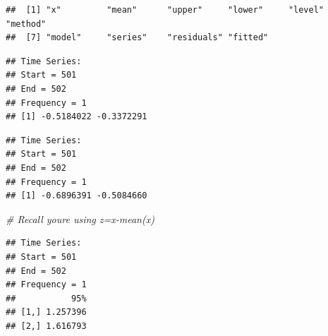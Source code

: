 \documentclass[
]{book}
\newenvironment{Shaded}{\begin{snugshade}}{\end{snugshade}}
\newcommand{\CommentTok}[1]{\textcolor[rgb]{0.56,0.35,0.01}{\textit{#1}}}
\newcommand{\FunctionTok}[1]{\textcolor[rgb]{0.00,0.00,0.00}{#1}}
\newcommand{\NormalTok}[1]{#1}
\newcommand{\SpecialCharTok}[1]{\textcolor[rgb]{0.00,0.00,0.00}{#1}}
\theoremstyle{definition}
\theoremstyle{definition}
\theoremstyle{definition}
\theoremstyle{definition}
\theoremstyle{remark}
\begin{document}
\begin{verbatim}
##  [1] "x"         "mean"      "upper"     "lower"     "level"     "method"   
##  [7] "model"     "series"    "residuals" "fitted"
\end{verbatim}

\begin{Shaded}
\end{Shaded}

\begin{verbatim}
## Time Series:
## Start = 501 
## End = 502 
## Frequency = 1 
## [1] -0.5184022 -0.3372291
\end{verbatim}

\begin{Shaded}
\end{Shaded}

\begin{verbatim}
## Time Series:
## Start = 501 
## End = 502 
## Frequency = 1 
## [1] -0.6896391 -0.5084660
\end{verbatim}

\begin{Shaded}
\begin{Highlighting}[]
\CommentTok{\# Recall you\textquotesingle{}re using z=x{-}mean(x)}
\end{Highlighting}
\end{Shaded}

\begin{Shaded}
\end{Shaded}

\begin{verbatim}
## Time Series:
## Start = 501 
## End = 502 
## Frequency = 1 
##           95%
## [1,] 1.257396
## [2,] 1.616793
\end{verbatim}

\begin{Shaded}
\end{Shaded}
\end{document}
